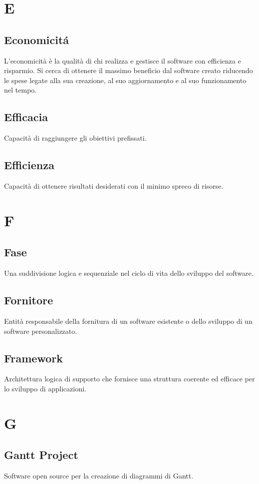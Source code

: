 \documentclass[12pt]{article}
\begin{document}
	\clearpage
	\section{E}
		\subsection{Economicit\'a}
			L’economicità è la qualità di chi realizza e gestisce il software con efficienza e risparmio. Si cerca di ottenere il massimo beneficio dal software creato riducendo le spese legate alla sua creazione, al suo aggiornamento e al suo funzionamento nel tempo.
		\subsection{Efficacia}
			Capacità di raggiungere gli obiettivi prefissati.
		\subsection{Efficienza}
			Capacità di ottenere risultati desiderati con il minimo spreco di risorse.
	\clearpage
	\section{F}
		\subsection{Fase}
			Una suddivisione logica e sequenziale nel ciclo di vita dello sviluppo del software.
		\subsection{Fornitore}
			Entità responsabile della fornitura di un software esistente o dello sviluppo di un software personalizzato.
		\subsection{Framework} 
			Architettura logica di supporto che fornisce una struttura coerente ed efficace per lo sviluppo di applicazioni.

	\clearpage
	\section{G}
		\subsection{Gantt Project}
			Software open source per la creazione di diagrammi di Gantt.
\end{document}
